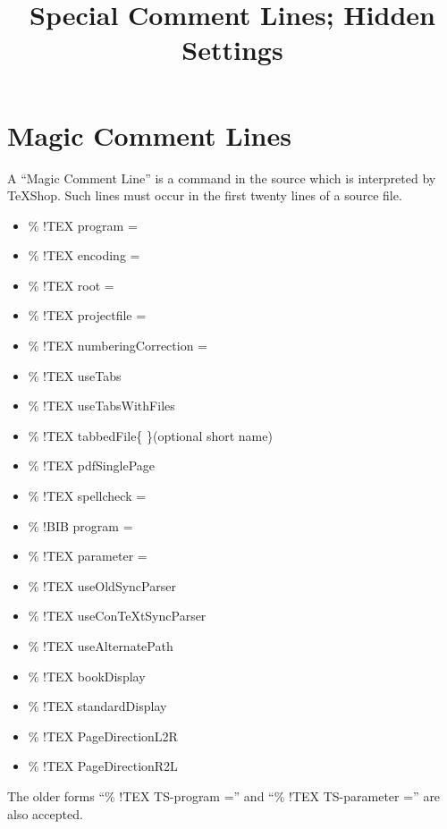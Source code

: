 \documentclass[11pt, oneside]{article}   	%
\title{Special Comment Lines; Hidden Settings}
\date{}							%
\begin{document}
\maketitle
\section{Magic Comment Lines}
A ``Magic Comment Line'' is a command in the source which is interpreted by TeXShop. Such lines must occur in the first twenty lines of a source file.

\begin{itemize}
\item \% !TEX program =
\item \% !TEX encoding =
\item \% !TEX root =
\item \% !TEX projectfile =
\item	\% !TEX numberingCorrection = 
\item \% !TEX useTabs
\item \% !TEX useTabsWithFiles
\item \% !TEX tabbedFile\{ \}(optional short name)
\item \% !TEX pdfSinglePage
\item \% !TEX spellcheck =
\item \% !BIB program =
\item \% !TEX parameter =
\item \% !TEX useOldSyncParser
\item \% !TEX useConTeXtSyncParser
\item \% !TEX useAlternatePath
\item \% !TEX bookDisplay
\item \% !TEX standardDisplay
\item \% !TEX PageDirectionL2R
\item	\% !TEX PageDirectionR2L

\end{itemize}

The older forms ``\% !TEX TS-program ='' and ``\% !TEX TS-parameter ='' are also accepted.
\end{document}
